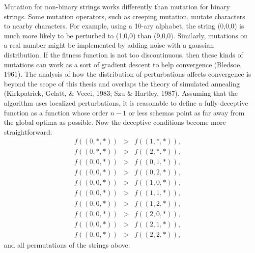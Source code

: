Mutation for non-binary strings works differently than mutation for binary
strings.  Some mutation operators, such as creeping mutation, mutate
characters to nearby characters.  For example, using a 10-ary alphabet,
the string (0,0,0) is much more likely to be perturbed to (1,0,0) than (9,0,0).
Similarly, mutations on a real number might be implemented by adding noise
with a gaussian distribution.  If the fitness function is not too
discontinuous, then these kinds of mutations can work as a sort of gradient
descent to help convergence (Bledsoe, 1961).  The analysis of how the distribution of
perturbations affects convergence is beyond the scope of this thesis
and overlaps the theory of simulated annealing (Kirkpatrick,
Gelatt, \& Vecci, 1983; Szu \& Hartley, 1987).
Assuming that the algorithm uses localized perturbations, it is reasonable to define a fully
deceptive function as a function whose order $n-1$ or less schemas point as far
away from the global optima as possible.  Now the deceptive conditions
become more straightforward:
\begin{eqnarray}
f((0,*,*)) &>& f((1,*,*)), \nonumber\\
f((0,*,*)) &>& f((2,*,*)), \nonumber\\
f((0,0,*)) &>& f((0,1,*)), \nonumber\\ 
f((0,0,*)) &>& f((0,2,*)), \nonumber\\ 
f((0,0,*)) &>& f((1,0,*)), \nonumber\\ 
f((0,0,*)) &>& f((1,1,*)), \nonumber\\ 
f((0,0,*)) &>& f((1,2,*)), \nonumber\\
f((0,0,*)) &>& f((2,0,*)), \nonumber\\
f((0,0,*)) &>& f((2,1,*)), \nonumber\\
f((0,0,*)) &>& f((2,2,*)),
\end{eqnarray} 
and all permutations of the strings above.

